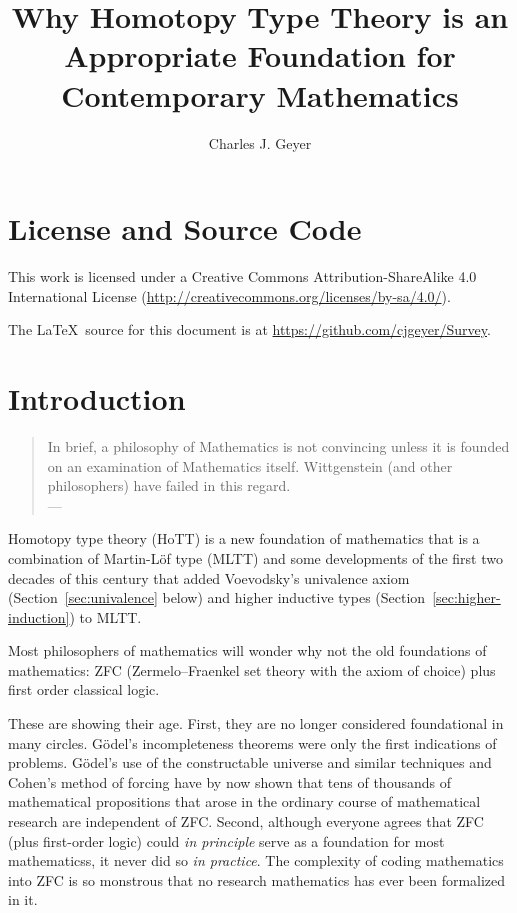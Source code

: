\documentclass[11pt]{article}
\begin{document}
\title{Why Homotopy Type Theory is an Appropriate Foundation for
    Contemporary Mathematics}
\author{Charles J. Geyer}
\maketitle

\tableofcontents

\section{License and Source Code}

This work is licensed under a Creative Commons
Attribution-ShareAlike 4.0 International License
(\url{http://creativecommons.org/licenses/by-sa/4.0/}).

The \LaTeX\ source for this document is
at \url{https://github.com/cjgeyer/Survey}.

\pagebreak[3]
\section{Introduction}

\begin{quotation}
In brief, a philosophy of Mathematics is not convincing unless it is
founded on an examination of Mathematics itself.
Wittgenstein (and other philosophers) have failed in this regard.
\\
\hspace*{\fill} --- \citet{maclane}
\end{quotation}

Homotopy type theory (HoTT)
\citep[hereinafter referred to as the HoTT book]{hott-book}
is a new foundation of mathematics that is
a combination of Martin-L\"{o}f type (MLTT)
\citep{martin-lof-mltt}
and some developments of the first two decades of this century
that added Voevodsky's univalence axiom (Section~\ref{sec:univalence} below)
and higher inductive types (Section~\ref{sec:higher-induction}) to MLTT.

Most philosophers of mathematics will wonder why not the old foundations
of mathematics: ZFC (Zermelo–Fraenkel set theory with the axiom of choice)
plus first order classical logic.

These are showing their age.  First, they are no longer considered foundational
in many circles.  G\"{o}del's incompleteness theorems were only the first
indications of problems.  G\"{o}del's use of the constructable universe
and similar techniques and Cohen's method of forcing have by now shown that
tens of thousands of mathematical propositions that arose in the ordinary
course of mathematical research are independent of ZFC.
Second, although everyone agrees that ZFC (plus first-order logic) could
\emph{in principle} serve as a foundation for most mathematicss, it never
did so \emph{in practice}.  The complexity of coding mathematics into ZFC
is so monstrous that no research mathematics has ever been formalized in
it.
\end{document}
